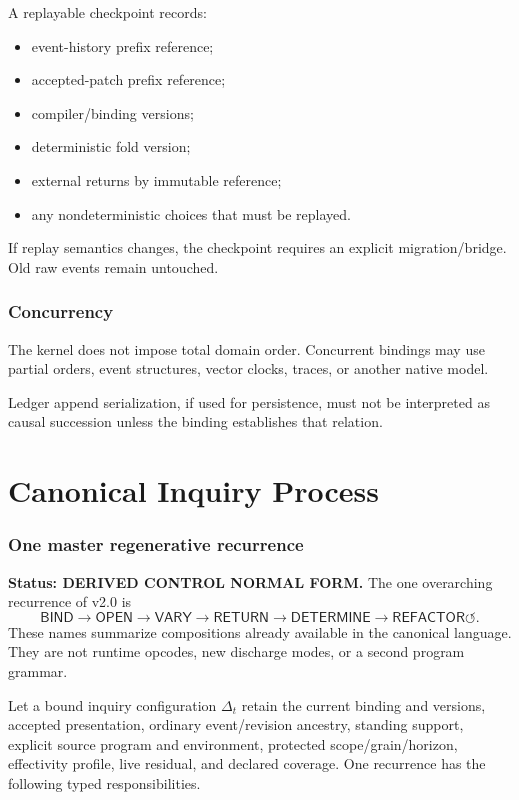 \documentclass[11pt,oneside]{article}
\begin{document}
A replayable checkpoint records:
\begin{itemize}
\item event-history prefix reference;
\item accepted-patch prefix reference;
\item compiler/binding versions;
\item deterministic fold version;
\item external returns by immutable reference;
\item any nondeterministic choices that must be replayed.
\end{itemize}

If replay semantics changes, the checkpoint requires an explicit migration/bridge.  Old raw events remain untouched.

\section{Concurrency}

The kernel does not impose total domain order.  Concurrent bindings may use partial orders, event structures, vector clocks, traces, or another native model.

Ledger append serialization, if used for persistence, must not be interpreted as causal succession unless the binding establishes that relation.

\part{Canonical Inquiry Process}

\section{One master regenerative recurrence}\label{sec:master-recurrence}

\textbf{Status: DERIVED CONTROL NORMAL FORM.}  The one overarching recurrence of v2.0 is
\[
\boxed{
\mathsf{BIND}
\to
\mathsf{OPEN}
\to
\mathsf{VARY}
\to
\mathsf{RETURN}
\to
\mathsf{DETERMINE}
\to
\mathsf{REFACTOR}
\circlearrowleft.
}
\]
These names summarize compositions already available in the canonical language.  They are not
runtime opcodes, new discharge modes, or a second program grammar.

Let a bound inquiry configuration \(\Delta_t\) retain the current binding and versions, accepted
presentation, ordinary event/revision ancestry, standing support, explicit source program and
environment, protected scope/grain/horizon, effectivity profile, live residual, and declared
coverage.  One recurrence has the following typed responsibilities.
\end{document}
